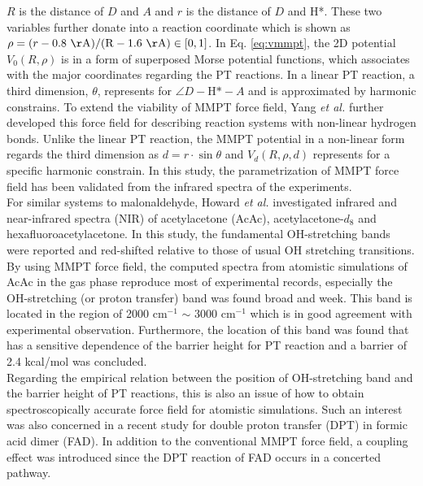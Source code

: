 \documentclass[journal=jacsat,manuscript=article]{achemso}
\begin{document}
$ R $ is the distance of $ D$ and $A $ and $ r $ is the distance of $ D$ and H*.
These two variables further donate into a reaction coordinate which is shown as $ \rho=(r-0.8~\rm\AA)/(R-1.6~\rm\AA)\in [0,1] $.
In Eq. \ref{eq:vmmpt}, the 2D potential $ V_{0}(R,\rho) $ is in a form of superposed Morse potential functions, which associates with the major coordinates regarding the PT reactions. In a linear PT reaction, a third dimension, $ \theta $, represents for $ \angle D-\textrm{H*}-A $ and is approximated by harmonic constrains\cite{lammersmeuwly.jcc.2008.mmpt,lammersmeuwly.jpca.2007.mmptdpt}. 
To extend the viability of MMPT force field, Yang \emph{et al.}\cite{yangmeuwly.jcp.2010.mmpt} further developed this force field for describing reaction systems with non-linear hydrogen bonds.
Unlike the linear PT reaction, the MMPT potential in a non-linear form regards the third dimension as $ d=r\cdot\sin\theta $ and $ V_{d}(R,\rho,d) $ represents for a specific harmonic constrain. In this study, the parametrization of MMPT force field has been validated from the infrared spectra of the experiments.
\\
\noindent
For similar systems to malonaldehyde, Howard \emph{et al.} investigated infrared and near-infrared spectra (NIR) of acetylacetone (AcAc), acetylacetone-$ d_8 $ and hexafluoroacetylacetone\cite{howardmeuwly.jpca.2015.mmpt}.
 In this study, the fundamental OH-stretching bands were reported and red-shifted relative to those of usual OH stretching transitions. By using MMPT force field, the computed spectra from atomistic simulations of AcAc in the gas phase reproduce
most of experimental records, especially the OH-stretching (or proton transfer) band was found broad and week. This band is located in the region of 2000 cm$ ^{-1} $ $ \sim $ 3000 cm$ ^{-1} $ which is in good agreement with experimental observation.
Furthermore, the location of this band was found that has a sensitive dependence of the barrier height for PT reaction and a barrier of 2.4 kcal/mol was concluded.
\\
\noindent
Regarding the empirical relation between the position of OH-stretching  band and the barrier height of PT reactions, this is also an issue of how to obtain spectroscopically accurate force field for atomistic simulations. Such an interest was also concerned in a recent study for double proton transfer (DPT) in formic acid dimer (FAD)\cite{mackeprangmeuwly.pccp.2016.mmpt}. In addition to the conventional MMPT force field, a coupling effect was introduced since the DPT reaction of FAD occurs in a concerted pathway.
\end{document}
